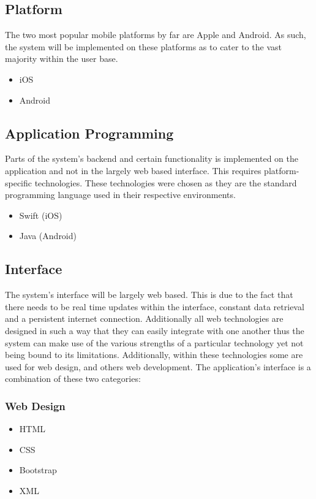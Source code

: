 \documentclass{article}
\begin{document}
	\subsection{Platform}
The two most popular mobile platforms by far are Apple and Android.  As such, the system will be implemented on these platforms as to cater to the vast majority within the user base. 
		\begin{itemize}
			\item iOS
			\item Android
		\end{itemize}
	\subsection{Application Programming}
Parts of the system's backend and certain functionality is implemented on the application and not in the largely web based interface.  This requires platform-specific technologies. These technologies were chosen as they are the standard programming language used in their respective environments.
		\begin{itemize}
			\item Swift (iOS)
			\item Java (Android)
		\end{itemize}
	\subsection{Interface}
The system's interface will be largely web based. This is due to the fact that there needs to be real time updates within the interface, constant data retrieval and a persistent internet connection.  Additionally all web technologies are designed in such a way that they can easily integrate with one another thus the system can make use of the various strengths of a particular technology yet not being bound to its limitations.  Additionally, within these technologies some are used for web design, and others web development.  The application's interface is a combination of these two categories:
		\subsubsection{Web Design}
			\begin{itemize}
				\item HTML
				\item CSS
				\item Bootstrap
				\item XML
			\end{itemize}
\end{document}
